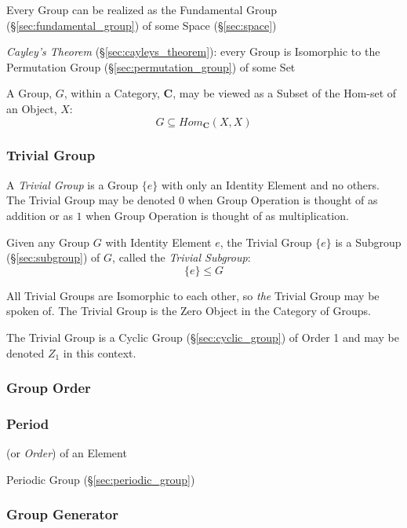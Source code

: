 Every Group can be realized as the Fundamental Group
(\S\ref{sec:fundamental_group}) of some Space (\S\ref{sec:space})

\emph{Cayley's Theorem} (\S\ref{sec:cayleys_theorem}): every Group is
Isomorphic to the Permutation Group (\S\ref{sec:permutation_group}) of
some Set

A Group, $G$, within a Category, $\mathbf{C}$, may be viewed as a
Subset of the Hom-set of an Object, $X$:
\[
    G \subseteq Hom_{\mathbf{C}}(X,X)
\]



\subsubsection{Trivial Group}\label{sec:trivial_group}

A \emph{Trivial Group} is a Group $\{e\}$ with only an Identity
Element and no others. The Trivial Group may be denoted $0$ when
Group Operation is thought of as addition or as $1$ when Group
Operation is thought of as multiplication.

Given any Group $G$ with Identity Element $e$, the Trivial Group
$\{e\}$ is a Subgroup (\S\ref{sec:subgroup}) of $G$, called the
\emph{Trivial Subgroup}:
\[
    \{e\} \leq G
\]

All Trivial Groups are Isomorphic to each other, so \emph{the} Trivial
Group may be spoken of. The Trivial Group is the Zero Object in the
Category of Groups.

The Trivial Group is a Cyclic Group (\S\ref{sec:cyclic_group}) of
Order 1 and may be denoted $Z_1$ in this context.



\subsubsection{Group Order}\label{sec:group_order}

\subsubsection{Period}\label{sec:period}

(or \emph{Order}) of an Element

Periodic Group (\S\ref{sec:periodic_group})



\subsubsection{Group Generator}\label{sec:group_generator}

